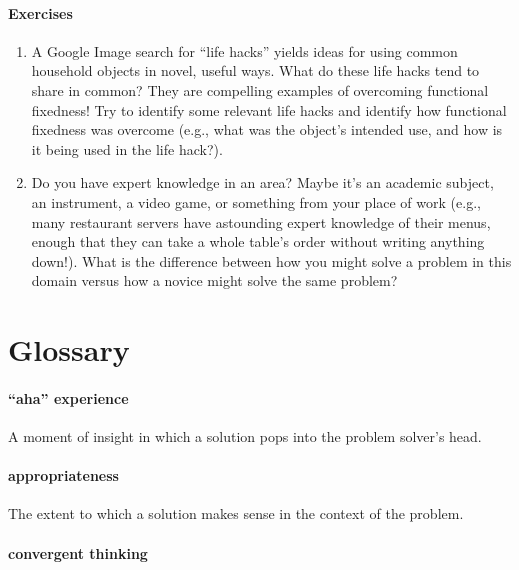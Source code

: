 \documentclass[
]{krantz}
\providecommand{\tightlist}{%
  \setlength{\itemsep}{0pt}\setlength{\parskip}{0pt}}
\begin{document}
\paragraph*{Exercises}\label{exercises-9}

\begin{enumerate}
\def\labelenumi{\arabic{enumi}.}
\tightlist
\item
  A Google Image search for ``life hacks'' yields ideas for using common household objects in novel, useful ways. What do these life hacks tend to share in common? They are compelling examples of overcoming functional fixedness! Try to identify some relevant life hacks and identify how functional fixedness was overcome (e.g., what was the object's intended use, and how is it being used in the life hack?).
\item
  Do you have expert knowledge in an area? Maybe it's an academic subject, an instrument, a video game, or something from your place of work (e.g., many restaurant servers have astounding expert knowledge of their menus, enough that they can take a whole table's order without writing anything down!). What is the difference between how you might solve a problem in this domain versus how a novice might solve the same problem?
\end{enumerate}

\section{Glossary}\label{glossary-8}

\paragraph*{``aha'' experience}\label{aha-experience}

A moment of insight in which a solution pops into the problem solver's head.

\paragraph*{appropriateness}\label{appropriateness}

The extent to which a solution makes sense in the context of the problem.

\paragraph*{convergent thinking}\label{convergent-thinking}
\end{document}
